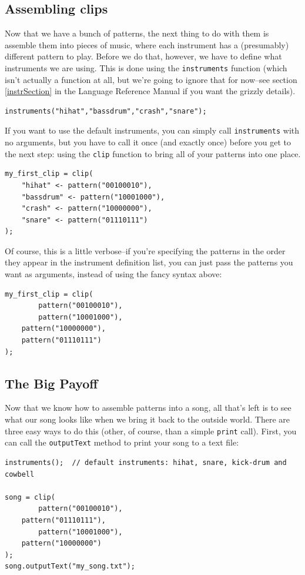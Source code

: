 \subsection{Assembling clips}

Now that we have a bunch of patterns, the next thing to do with them is assemble them into pieces of music, where each instrument has a (presumably) different pattern to play.  Before we do that, however, we have to define what instruments we are using.  This is done using the {\tt instruments} function (which isn't actually a function at all, but we're going to ignore that for now--see section \ref{instrSection} in the Language Reference Manual if you want the grizzly details).
\begin{lstlisting}
instruments("hihat","bassdrum","crash","snare");
\end{lstlisting}
If you want to use the default instruments, you can simply call {\tt instruments} with no arguments, but you have to call it once (and exactly once) before you get to the next step: using the {\tt clip} function to bring all of your patterns into one place.
\begin{lstlisting}
my_first_clip = clip(
    "hihat" <- pattern("00100010"),
    "bassdrum" <- pattern("10001000"),
    "crash" <- pattern("10000000"),
    "snare" <- pattern("01110111")
);
\end{lstlisting}
Of course, this is a little verbose--if you're specifying the patterns in the order they appear in the instrument definition list, you can just pass the patterns you want as arguments, instead of using the fancy syntax above:
\begin{lstlisting}
my_first_clip = clip(
    	pattern("00100010"),
    	pattern("10001000"),
	pattern("10000000"),
	pattern("01110111")
);
\end{lstlisting}

\subsection{The Big Payoff}
Now that we know how to assemble patterns into a song, all that's left is to see what our song looks like 
when we bring it back to the outside world.  There are three easy ways to do this (other, of course, than a simple {\tt print} call).  First, you can call the {\tt outputText} method to print your song to a text file:
\begin{lstlisting}
instruments();  // default instruments: hihat, snare, kick-drum and cowbell

song = clip(
    	pattern("00100010"),
	pattern("01110111"),
    	pattern("10001000"),
	pattern("10000000")
);
song.outputText("my_song.txt");
\end{lstlisting}

